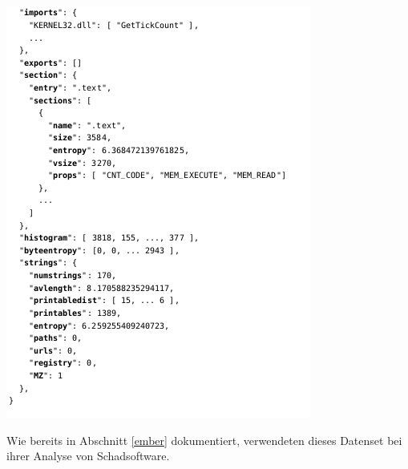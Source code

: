 \documentclass[
    12pt, %
    DIV10,
    ngerman, %
    a4paper, %
    oneside, %
    titlepage, %
    parskip=half, %
    headings=normal, %
    listof=totoc, %
    bibliography=totoc, %
    index=totoc, %
    captions=tableheading, %
    final %
]{scrreprt}
\begin{document}
\begin{center}
\includegraphics[scale=0.7]{img/ember2.png}
\label{fig:ember}
\end{center}
Wie bereits in Abschnitt \ref{ember} dokumentiert, verwendeten \textcite{Vinayakumar2019} dieses Datenset bei ihrer Analyse von Schadsoftware.
\end{document}
